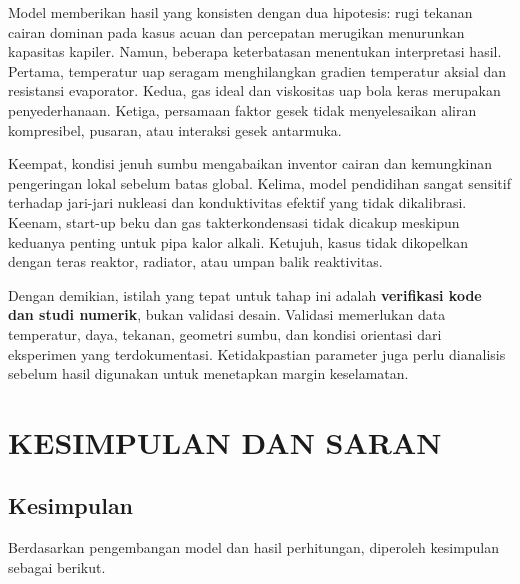 \documentclass[
  12pt,a4paper,oneside]{report}
\begin{document}
Model memberikan hasil yang konsisten dengan dua hipotesis: rugi tekanan
cairan dominan pada kasus acuan dan percepatan merugikan menurunkan
kapasitas kapiler. Namun, beberapa keterbatasan menentukan interpretasi
hasil. Pertama, temperatur uap seragam menghilangkan gradien temperatur
aksial dan resistansi evaporator. Kedua, gas ideal dan viskositas uap
bola keras merupakan penyederhanaan. Ketiga, persamaan faktor gesek
tidak menyelesaikan aliran kompresibel, pusaran, atau interaksi gesek
antarmuka.

Keempat, kondisi jenuh sumbu mengabaikan inventor cairan dan kemungkinan
pengeringan lokal sebelum batas global. Kelima, model pendidihan sangat
sensitif terhadap jari-jari nukleasi dan konduktivitas efektif yang
tidak dikalibrasi. Keenam, start-up beku dan gas takterkondensasi tidak
dicakup meskipun keduanya penting untuk pipa kalor alkali. Ketujuh,
kasus tidak dikopelkan dengan teras reaktor, radiator, atau umpan balik
reaktivitas.

Dengan demikian, istilah yang tepat untuk tahap ini adalah
\textbf{verifikasi kode dan studi numerik}, bukan validasi desain.
Validasi memerlukan data temperatur, daya, tekanan, geometri sumbu, dan
kondisi orientasi dari eksperimen yang terdokumentasi. Ketidakpastian
parameter juga perlu dianalisis sebelum hasil digunakan untuk menetapkan
margin keselamatan.

\hypertarget{kesimpulan-dan-saran}{%
\chapter{KESIMPULAN DAN SARAN}\label{kesimpulan-dan-saran}}

\hypertarget{kesimpulan}{%
\section{Kesimpulan}\label{kesimpulan}}

Berdasarkan pengembangan model dan hasil perhitungan, diperoleh
kesimpulan sebagai berikut.
\end{document}
